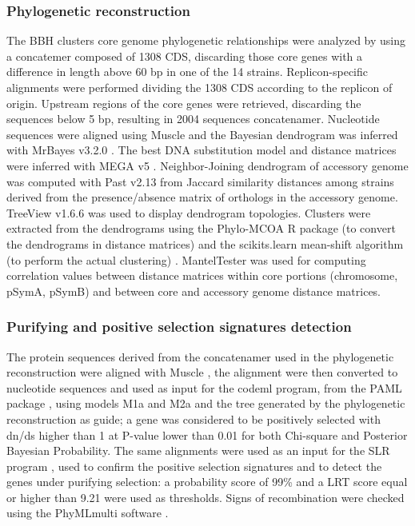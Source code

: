 \begin{small}
\subsubsection{Phylogenetic reconstruction}
The BBH clusters core genome phylogenetic relationships were analyzed by using a concatemer composed of 1308 CDS, discarding those core genes with a difference in length above 60 bp in one of the 14 strains. Replicon-specific alignments were performed dividing the 1308 CDS according to the replicon of origin. Upstream regions of the core genes were retrieved, discarding the sequences below 5 bp, resulting in 2004 sequences concatenamer. Nucleotide sequences were aligned using Muscle \cite{edgar2004muscle} and the Bayesian dendrogram was inferred with MrBayes v3.2.0 \cite{huelsenbeck2001mrbayes}. The best DNA substitution model and distance matrices were inferred with MEGA v5 \cite{tamura2011mega5}. Neighbor-Joining dendrogram of accessory genome was computed with Past v2.13 \cite{hammer2001past} from Jaccard similarity distances among strains derived from the presence/absence matrix of orthologs in the accessory genome. TreeView v1.6.6 was used to display dendrogram topologies. Clusters were extracted from the dendrograms using the Phylo-MCOA R package (to convert the dendrograms in distance matrices) and the scikits.learn mean-shift algorithm (to perform the actual clustering) \cite{pedregosa2011scikit}. MantelTester \cite{bonnet2002zt} was used for computing correlation values between distance matrices within core portions (chromosome, pSymA, pSymB) and between core and accessory genome distance matrices.

\subsubsection{Purifying and positive selection signatures detection}
The protein sequences derived from the concatenamer used in the phylogenetic reconstruction were aligned with Muscle \cite{edgar2004muscle}, the alignment were then converted to nucleotide sequences and used as input for the codeml program, from the PAML package \cite{yang1997paml}, using models M1a and M2a and the tree generated by the phylogenetic reconstruction as guide; a gene was considered to be positively selected with dn/ds higher than 1 at P-value lower than 0.01 for both Chi-square and Posterior Bayesian Probability. The same alignments were used as an input for the SLR program \cite{massingham2005detecting}, used to confirm the positive selection signatures and to detect the genes under purifying selection: a probability score of 99\% and a LRT score  equal or higher than 9.21 were used as thresholds. Signs of recombination were checked using the PhyMLmulti software \cite{boussau2009mixture}. 


\end{small}
